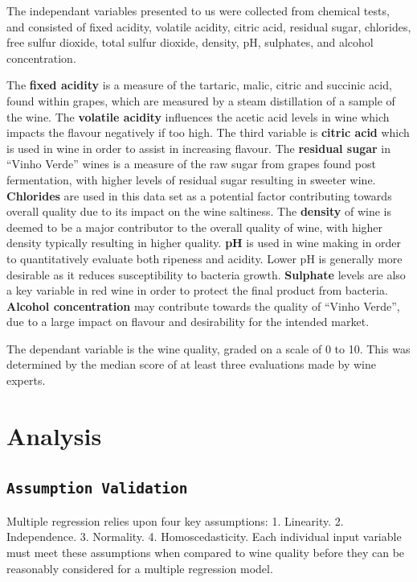 \documentclass[letterpaper,8pt,twocolumn,twoside,]{pinp}
\begin{document}
The independant variables presented to us were collected from chemical
tests, and consisted of fixed acidity, volatile acidity, citric acid,
residual sugar, chlorides, free sulfur dioxide, total sulfur dioxide,
density, pH, sulphates, and alcohol concentration.

The \textbf{fixed acidity} is a measure of the tartaric, malic, citric
and succinic acid, found within grapes, which are measured by a steam
distillation of a sample of the wine. The \textbf{volatile acidity}
influences the acetic acid levels in wine which impacts the flavour
negatively if too high. The third variable is \textbf{citric acid} which
is used in wine in order to assist in increasing flavour. The
\textbf{residual sugar} in ``Vinho Verde'' wines is a measure of the raw
sugar from grapes found post fermentation, with higher levels of
residual sugar resulting in sweeter wine. \textbf{Chlorides} are used in
this data set as a potential factor contributing towards overall quality
due to its impact on the wine saltiness. The \textbf{density} of wine is
deemed to be a major contributor to the overall quality of wine, with
higher density typically resulting in higher quality. \textbf{pH} is
used in wine making in order to quantitatively evaluate both ripeness
and acidity. Lower pH is generally more desirable as it reduces
susceptibility to bacteria growth. \textbf{Sulphate} levels are also a
key variable in red wine in order to protect the final product from
bacteria. \textbf{Alcohol concentration} may contribute towards the
quality of ``Vinho Verde'', due to a large impact on flavour and
desirability for the intended market.

The dependant variable is the wine quality, graded on a scale of 0 to
10. This was determined by the median score of at least three
evaluations made by wine experts.

\hypertarget{analysis}{%
\section{Analysis}\label{analysis}}

\hypertarget{assumption-validation}{%
\subsection{\texorpdfstring{\texttt{Assumption\ Validation}}{Assumption Validation}}\label{assumption-validation}}

Multiple regression relies upon four key assumptions: 1. Linearity. 2.
Independence. 3. Normality. 4. Homoscedasticity. Each individual input
variable must meet these assumptions when compared to wine quality
before they can be reasonably considered for a multiple regression
model.
\end{document}
